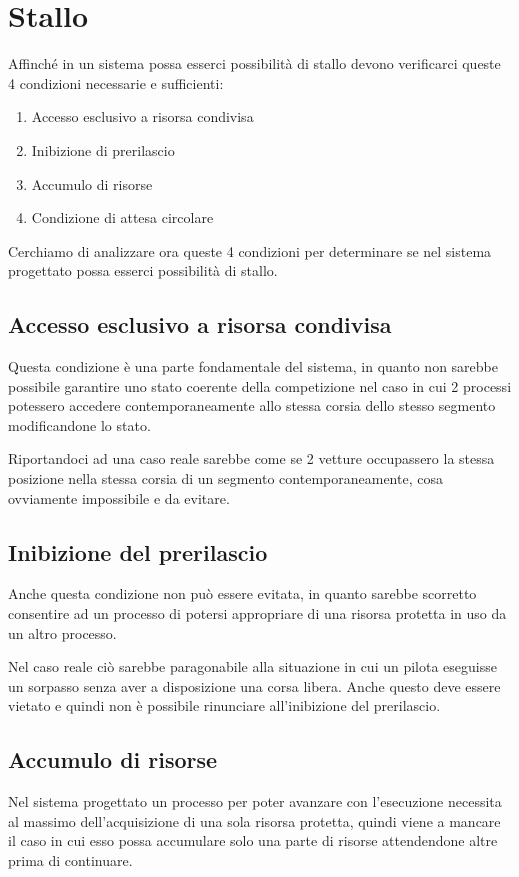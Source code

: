 \documentclass[a4paper,11pt, twoside]{book}
\begin{document}
    \section{Stallo}
      Affinché in un sistema possa esserci possibilità di stallo devono verificarci queste 4 condizioni
      necessarie e sufficienti:
      
      \begin{enumerate}
       \item Accesso esclusivo a risorsa condivisa
       \item Inibizione di prerilascio
       \item Accumulo di risorse
       \item Condizione di attesa circolare
      \end{enumerate}
      
      Cerchiamo di analizzare ora queste 4 condizioni per determinare se nel sistema progettato
      possa esserci possibilità di stallo.
      
      \subsection{Accesso esclusivo a risorsa condivisa}
        Questa condizione è una parte fondamentale del sistema, in quanto non sarebbe possibile
	garantire uno stato coerente della competizione nel caso in cui 2 processi potessero accedere
	contemporaneamente allo stessa corsia dello stesso segmento modificandone lo stato.
	
	Riportandoci ad una caso reale sarebbe come se 2 vetture occupassero la stessa posizione nella stessa
	corsia di un segmento contemporaneamente,
	cosa ovviamente impossibile e da evitare.
	
      \subsection{Inibizione del prerilascio}
        Anche questa condizione non può essere evitata, in quanto sarebbe scorretto consentire ad un processo
	di potersi appropriare di una risorsa protetta in uso da un altro processo.
	
	Nel caso reale ciò sarebbe paragonabile alla situazione in cui un pilota eseguisse un sorpasso
	senza aver a disposizione una corsa libera. Anche questo deve essere vietato e quindi
	non è possibile rinunciare all'inibizione del prerilascio.
	
      \subsection{Accumulo di risorse}
        Nel sistema progettato un processo per poter avanzare con l'esecuzione necessita
	al massimo dell'acquisizione di una sola risorsa protetta, quindi viene a mancare il caso in cui esso possa accumulare
	solo una parte di risorse attendendone altre prima di continuare.
	
\end{document}

